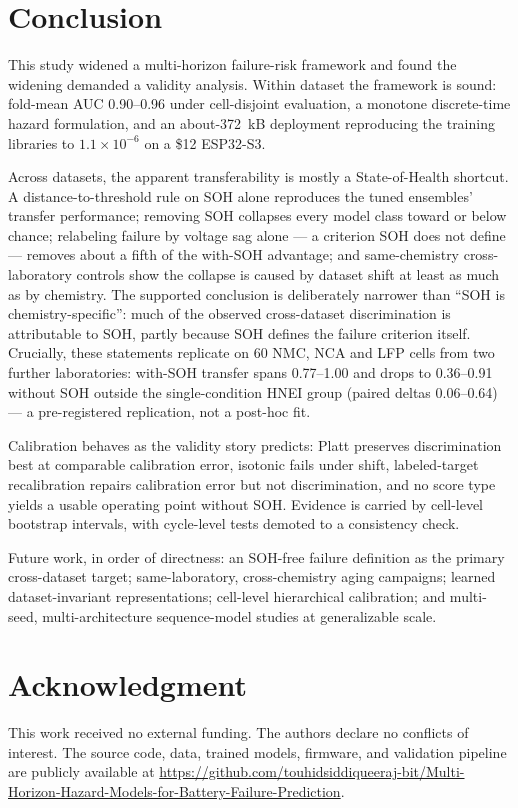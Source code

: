 \documentclass[preprint,12pt]{elsarticle}
\begin{document}
\section{Conclusion}
This study widened a multi-horizon failure-risk framework and found the widening demanded a validity analysis. Within dataset the framework is sound: fold-mean AUC 0.90--0.96 under cell-disjoint evaluation, a monotone discrete-time hazard formulation, and an about-372~kB deployment reproducing the training libraries to $1.1\times10^{-6}$ on a \$12 ESP32-S3.

Across datasets, the apparent transferability is mostly a State-of-Health shortcut. A distance-to-threshold rule on SOH alone reproduces the tuned ensembles' transfer performance; removing SOH collapses every model class toward or below chance; relabeling failure by voltage sag alone --- a criterion SOH does not define --- removes about a fifth of the with-SOH advantage; and same-chemistry cross-laboratory controls show the collapse is caused by dataset shift at least as much as by chemistry. The supported conclusion is deliberately narrower than ``SOH is chemistry-specific'': much of the observed cross-dataset discrimination is attributable to SOH, partly because SOH defines the failure criterion itself. Crucially, these statements replicate on 60 NMC, NCA and LFP cells from two further laboratories: with-SOH transfer spans 0.77--1.00 and drops to 0.36--0.91 without SOH outside the single-condition HNEI group (paired deltas 0.06--0.64) --- a pre-registered replication, not a post-hoc fit.

Calibration behaves as the validity story predicts: Platt preserves discrimination best at comparable calibration error, isotonic fails under shift, labeled-target recalibration repairs calibration error but not discrimination, and no score type yields a usable operating point without SOH. Evidence is carried by cell-level bootstrap intervals, with cycle-level tests demoted to a consistency check.

Future work, in order of directness: an SOH-free failure definition as the primary cross-dataset target; same-laboratory, cross-chemistry aging campaigns; learned dataset-invariant representations; cell-level hierarchical calibration; and multi-seed, multi-architecture sequence-model studies at generalizable scale.

\clearpage
\section*{Acknowledgment}
This work received no external funding. The authors declare no conflicts of interest. The source code, data, trained models, firmware, and validation pipeline are publicly available at \url{https://github.com/touhidsiddiqueeraj-bit/Multi-Horizon-Hazard-Models-for-Battery-Failure-Prediction}.
\end{document}
